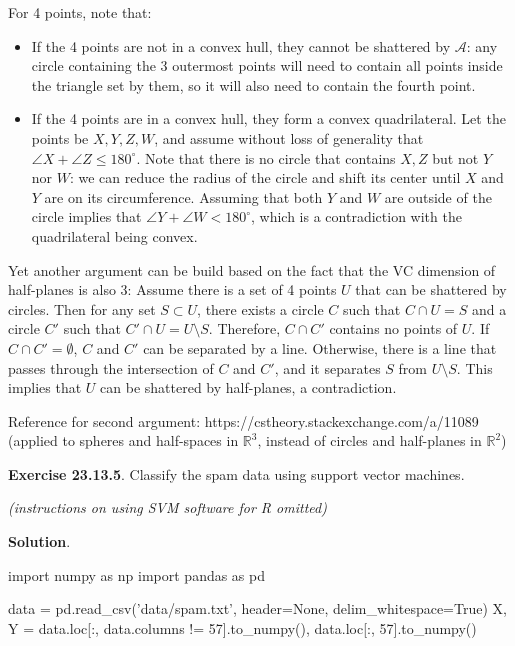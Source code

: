 For 4 points, note that:

\begin{itemize}[tightlist]
\item
  If the 4 points are not in a convex hull, they cannot be shattered by
  \(\mathcal{A}\): any circle containing the 3 outermost points will
  need to contain all points inside the triangle set by them, so it will
  also need to contain the fourth point.
\item
  If the 4 points are in a convex hull, they form a convex
  quadrilateral. Let the points be \(X, Y, Z, W\), and assume without
  loss of generality that \(\angle X + \angle Z \leq 180^\circ\). Note
  that there is no circle that contains \(X, Z\) but not \(Y\) nor
  \(W\): we can reduce the radius of the circle and shift its center
  until \(X\) and \(Y\) are on its circumference. Assuming that both
  \(Y\) and \(W\) are outside of the circle implies that
  \(\angle Y + \angle W < 180^\circ\), which is a contradiction with the
  quadrilateral being convex.
\end{itemize}

Yet another argument can be build based on the fact that the VC
dimension of half-planes is also 3: Assume there is a set of 4 points
\(U\) that can be shattered by circles. Then for any set
\(S \subset U\), there exists a circle \(C\) such that \(C \cap U = S\)
and a circle \(C'\) such that \(C' \cap U = U \setminus S\). Therefore,
\(C \cap C'\) contains no points of \(U\). If \(C \cap C' = \emptyset\),
\(C\) and \(C'\) can be separated by a line. Otherwise, there is a line
that passes through the intersection of \(C\) and \(C'\), and it
separates \(S\) from \(U \setminus S\). This implies that \(U\) can be
shattered by half-planes, a contradiction.

Reference for second argument:
https://cstheory.stackexchange.com/a/11089 (applied to spheres and
half-spaces in \(\mathbb{R}^3\), instead of circles and half-planes in
\(\mathbb{R}^2\))

\textbf{Exercise 23.13.5}. Classify the spam data using support vector
machines.

\emph{(instructions on using SVM software for R omitted)}

\textbf{Solution}.

\begin{python}
import numpy as np
import pandas as pd

data = pd.read_csv('data/spam.txt', header=None, delim_whitespace=True)
X, Y = data.loc[:, data.columns != 57].to_numpy(), data.loc[:, 57].to_numpy()
\end{python}

